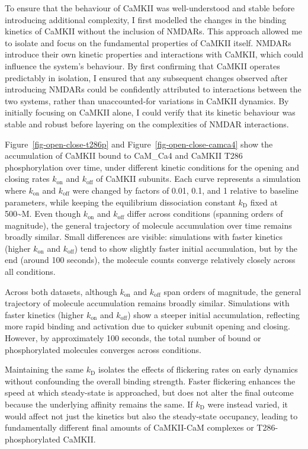 \documentclass[
  11pt,
  letterpaper,
]{scrreprt}
\begin{document}
To ensure that the behaviour of CaMKII was well-understood and stable
before introducing additional complexity, I first modelled the changes
in the binding kinetics of CaMKII without the inclusion of NMDARs. This
approach allowed me to isolate and focus on the fundamental properties
of CaMKII itself. NMDARs introduce their own kinetic properties and
interactions with CaMKII, which could influence the system's behaviour.
By first confirming that CaMKII operates predictably in isolation, I
ensured that any subsequent changes observed after introducing NMDARs
could be confidently attributed to interactions between the two systems,
rather than unaccounted-for variations in CaMKII dynamics. By initially
focusing on CaMKII alone, I could verify that its kinetic behaviour was
stable and robust before layering on the complexities of NMDAR
interactions.

Figure~\ref{fig-open-close-t286p} and Figure~\ref{fig-open-close-camca4}
show the accumulation of CaMKII bound to CaM\_Ca4 and CaMKII T286
phosphorylation over time, under different kinetic conditions for the
opening and closing rates \(k_\text{on}\) and \(k_\text{off}\) of CaMKII
subunits. Each curve represents a simulation where \(k_\text{on}\) and
\(k_\text{off}\) were changed by factors of 0.01, 0.1, and 1 relative to
baseline parameters, while keeping the equilibrium dissociation constant
\(k_{\text{D}}\) fixed at 500\textasciitilde M. Even though
\(k_\text{on}\) and \(k_\text{off}\) differ across conditions (spanning
orders of magnitude), the general trajectory of molecule accumulation
over time remains broadly similar. Small differences are visible:
simulations with faster kinetics (higher \(k_\text{on}\) and
\(k_\text{off}\)) tend to show slightly faster initial accumulation, but
by the end (around 100 seconds), the molecule counts converge relatively
closely across all conditions.

Across both datasets, although \(k_\text{on}\) and \(k_\text{off}\) span
orders of magnitude, the general trajectory of molecule accumulation
remains broadly similar. Simulations with faster kinetics (higher
\(k_\text{on}\) and \(k_\text{off}\)) show a steeper initial
accumulation, reflecting more rapid binding and activation due to
quicker subunit opening and closing. However, by approximately 100
seconds, the total number of bound or phosphorylated molecules converges
across conditions.

Maintaining the same \(k_{\text{D}}\) isolates the effects of flickering
rates on early dynamics without confounding the overall binding
strength. Faster flickering enhances the speed at which steady-state is
approached, but does not alter the final outcome because the underlying
affinity remains the same. If \(k_{\text{D}}\) were instead varied, it
would affect not just the kinetics but also the steady-state occupancy,
leading to fundamentally different final amounts of CaMKII-CaM complexes
or T286-phosphorylated CaMKII.
\end{document}
